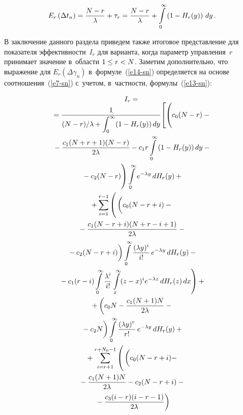 \begin{multicols}{2}
\noindent
  $$
  E_r\left(\Delta t_n\right) =\displaystyle\frac{\displaystyle N-r\mathstrut}{\displaystyle \lambda\mathstrut} +\tau_r =\displaystyle\frac{\displaystyle N-r\mathstrut}{\displaystyle \lambda\mathstrut} + 
\int\limits_0^\infty \left( 1-H_r(y)\right)\,dy\,.
  $$
  
  В заключение данного раздела приведем также итоговое пред\-став\-ле\-ние для 
показателя эффективности~$I_r$ для варианта, когда параметр управ\-ле\-ния~$r$ 
принимает значение в~об\-ласти $1\hm\leq r\hm<N$. Заметим дополнительно, что 
выражение для $E_r(\Delta \gamma_n)$ в~формуле~(\ref{e14-sn}) 
определяется на основе соотношения~(\ref{e7-sn}) с~учетом, в~частности, 
формулы~(\ref{e13-sn}):

\vspace*{-4pt}

\noindent
  \begin{multline*}
  I_r={}\\[-6pt]
  {}=\fr{1}{(N-r)/\lambda  +\int\nolimits_0^\infty (1-H_r(y))\,dy}\! \left[ \left(
  \vphantom{\int\limits_0^\infty} 
c_0(N-r) -{}\right.\right.\\
{}-\fr{c_1(N+r+1)(N-r)}{2\lambda} -c_1 r\int\limits_0^\infty \left(1-
H_r(y)\right)dy-{}\\
\left.{}-c_2(N-r)
  \vphantom{\int\limits_0^\infty}
\right) \int\limits_0^\infty e^{-\lambda y}\,dH_r(y)+{}\\
{}+\sum\limits_{i=1}^{r-1} \left(
  \vphantom{\int\limits_0^\infty} \left(
\vphantom{\fr{c_1(N-r+i)(N+r-i+1)}{2\lambda}}
 c_0(N-r+i) -{}\right.\right.\\
 {}-\fr{c_1(N-r+i)(N+r-i+1)}{2\lambda} -{}\\
\left. {}- c_2(N-r+i)
\vphantom{\fr{c_1(N-r)}{2\lambda}}
\right)
 \int\limits_0^\infty \fr{(\lambda y)^i}{i!}\,e^{-\lambda y} \,dH_r(y) -{}\\
 \left.  {}-c_1 (r-i) \int\limits_0^\infty 
  \fr{\lambda^i}{i!}
 \int\limits_x^\infty (z-x)^i e^{-\lambda z}\, dH_r(z)\,dx\right) +{}\\
 {}+
  \left( 
  \vphantom{\fr{c_1(N+1)N}{2\lambda}}
  c_0N-\fr{c_1(N+1)N}{2\lambda} -{}\right.\\
 \left. {}-c_2N
\vphantom{\fr{c_1(N+1)N}{2\lambda}}
\right) \int\limits_0^\infty 
\fr{(\lambda y)^r}{r!}\,e^{-\lambda y} \,dH_r(y)
  +{}\\
  {}+\sum\limits_{i=r+1}^{r+N_0-1} \left( 
  \vphantom{\int\limits_0^\infty}\left( 
  \vphantom{\fr{c_3(i-r)}{2\lambda}}
  c_0(N-r+i) -\right.\right.\\
  {}-
\fr{c_1(N+1)N}{2\lambda} -
c_2(N-r+i)-{}\\
\left.{}-\fr{c_3(i-r)(i-r-1)}{2\lambda} \right) 

\end{multline*}
\end{multicols}
